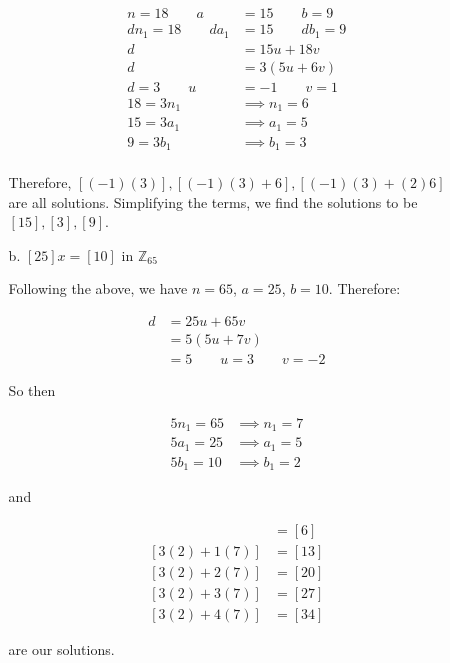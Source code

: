 \documentclass{article}
\begin{document}
\begin{enumerate}
\begin{enumerate}
					\begin{align*}
						n = 18 \qquad a & = 15 \qquad b = 9 \\
						dn_1 = 18 \qquad da_1 & = 15 \qquad db_1 = 9 \\
						d & = 15u + 18v \\
						d & = 3(5u + 6v) \\
						d = 3 \qquad u & = -1 \qquad v = 1 \\
						18 = 3n_1 & \implies n_1 = 6 \\
						15 = 3a_1 & \implies a_1 = 5 \\
						9 = 3b_1 & \implies b_1 = 3 \\
					\end{align*}

					Therefore, $[(-1)(3)], [(-1)(3) + 6], [(-1)(3) + (2)6]$ are all solutions.
					Simplifying the terms, we find the solutions to be $[15], [3], [9]$.

				\item [b.] $[25]x = [10]$ in $\mathbb{Z}_{65}$

					Following the above, we have $n = 65$, $a = 25$, $b = 10$. Therefore:

					\begin{align*}
						d & = 25u + 65v \\
						  & = 5(5u + 7v) \\
						  & = 5 \qquad u = 3 \qquad v = -2
					\end{align*}

					So then

					\begin{align*}
						5n_1 = 65 & \implies n_1 = 7 \\
						5a_1 = 25 & \implies a_1 = 5 \\
						5b_1 = 10 & \implies b_1 = 2
					\end{align*}

					and 

					\begin{align*}
						[3(2) + 0(7)] & = [6] \\
						[3(2) + 1(7)] & = [13] \\
						[3(2) + 2(7)] & = [20] \\
						[3(2) + 3(7)] & = [27] \\
						[3(2) + 4(7)] & = [34]
					\end{align*}

					are our solutions.
			\end{enumerate}
	\end{enumerate}
\end{document}
